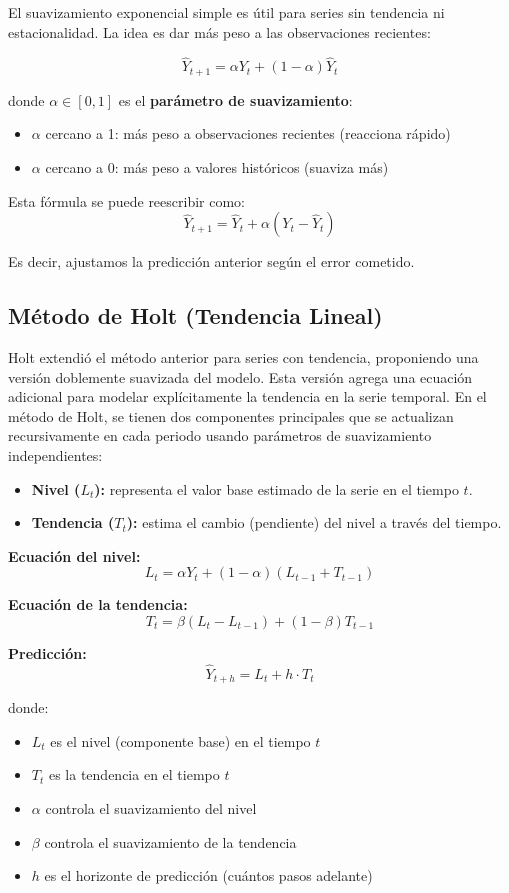 \documentclass[12pt]{article}
\begin{document}
El suavizamiento exponencial simple es útil para series sin tendencia ni estacionalidad. La idea es dar más peso a las observaciones recientes:

\[
\hat{Y}_{t+1} = \alpha Y_t + (1-\alpha) \hat{Y}_t
\]

donde $\alpha \in [0,1]$ es el \textbf{parámetro de suavizamiento}:
\begin{itemize}
    \item $\alpha$ cercano a 1: más peso a observaciones recientes (reacciona rápido)
    \item $\alpha$ cercano a 0: más peso a valores históricos (suaviza más)
\end{itemize}

Esta fórmula se puede reescribir como:
\[
\hat{Y}_{t+1} = \hat{Y}_t + \alpha(Y_t - \hat{Y}_t)
\]

Es decir, ajustamos la predicción anterior según el error cometido.

\subsection{Método de Holt (Tendencia Lineal)}

Holt extendió el método anterior para series con tendencia, proponiendo una versión doblemente suavizada del modelo. Esta versión agrega una ecuación adicional para modelar explícitamente la tendencia en la serie temporal. En el método de Holt, se tienen dos componentes principales que se actualizan recursivamente en cada periodo usando parámetros de suavizamiento independientes:

\begin{itemize}
    \item \textbf{Nivel ($L_t$):} representa el valor base estimado de la serie en el tiempo $t$.
    \item \textbf{Tendencia ($T_t$):} estima el cambio (pendiente) del nivel a través del tiempo.
\end{itemize}

\textbf{Ecuación del nivel:}
\[
L_t = \alpha Y_t + (1-\alpha)(L_{t-1} + T_{t-1})
\]

\textbf{Ecuación de la tendencia:}
\[
T_t = \beta(L_t - L_{t-1}) + (1-\beta)T_{t-1}
\]

\textbf{Predicción:}
\[
\hat{Y}_{t+h} = L_t + h \cdot T_t
\]

donde:
\begin{itemize}
    \item $L_t$ es el nivel (componente base) en el tiempo $t$
    \item $T_t$ es la tendencia en el tiempo $t$
    \item $\alpha$ controla el suavizamiento del nivel
    \item $\beta$ controla el suavizamiento de la tendencia
    \item $h$ es el horizonte de predicción (cuántos pasos adelante)
\end{itemize}
\end{document}
